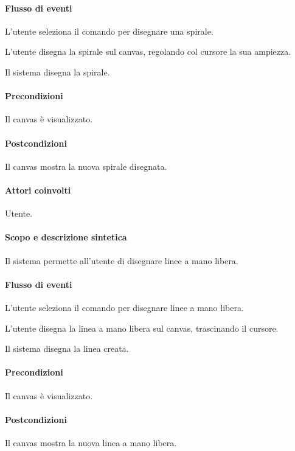 \paragraph{Flusso di eventi}
\begin{elenconumerato}[\textbf{}]{\subsubsecindent}
\item L'utente seleziona il comando per disegnare una spirale.
\item L'utente disegna la spirale sul canvas, regolando col cursore la sua ampiezza.
\item Il sistema disegna la spirale.
\end{elenconumerato}
\paragraph{Precondizioni} Il canvas \`e visualizzato.
\paragraph{Postcondizioni} Il canvas mostra la nuova spirale disegnata.

\paragraph{Attori coinvolti} Utente.
\paragraph{Scopo e descrizione sintetica} 
Il sistema permette all'utente di disegnare linee a mano libera.
\paragraph{Flusso di eventi}
\begin{elenconumerato}[\textbf{}]{\subsubsecindent}
\item L'utente seleziona il comando per disegnare linee a mano libera.
\item L'utente disegna la linea a mano libera sul canvas, trascinando il cursore.
\item Il sistema disegna la linea creata.
\end{elenconumerato}
\paragraph{Precondizioni} Il canvas \`e visualizzato.
\paragraph{Postcondizioni} Il canvas mostra la nuova linea a mano libera.

